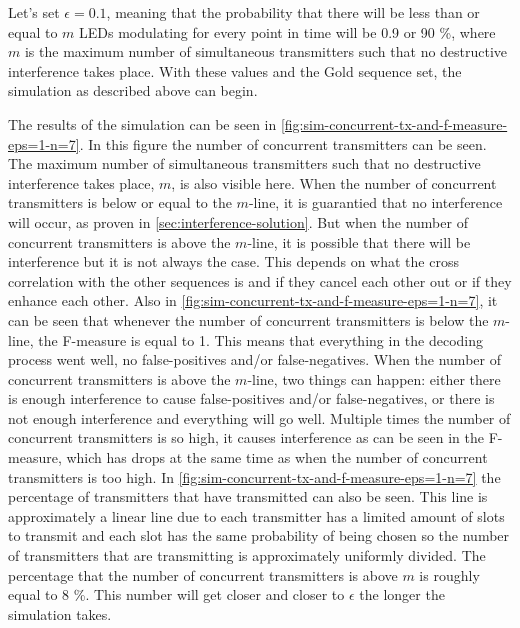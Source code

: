 Let's set $\epsilon = 0.1$, meaning that the probability that there will be less than or equal to $m$ LEDs modulating for every point in time will be 0.9 or 90 \%, where $m$ is the maximum number of simultaneous transmitters such that no destructive interference takes place.
With these values and the Gold sequence set, the simulation as described above can begin. 



The results of the simulation can be seen in \autoref{fig:sim-concurrent-tx-and-f-measure-eps=1-n=7}.
In this figure the number of concurrent transmitters can be seen. 
The maximum number of simultaneous transmitters such that no destructive interference takes place, $m$, is also visible here.
When the number of concurrent transmitters is below or equal to the $m$-line, it is guarantied that no interference will occur, as proven in \autoref{sec:interference-solution}.
But when the number of concurrent transmitters is above the $m$-line, it is possible that there will be interference but it is not always the case.
This depends on what the cross correlation with the other sequences is and if they cancel each other out or if they enhance each other.
Also in \autoref{fig:sim-concurrent-tx-and-f-measure-eps=1-n=7}, it can be seen that whenever the number of concurrent transmitters is below the $m$-line, the F-measure is equal to 1.
This means that everything in the decoding process went well, no false-positives and/or false-negatives.
When the number of concurrent transmitters is above the $m$-line, two things can happen: either there is enough interference to cause false-positives and/or false-negatives, or there is not enough interference and everything will go well.
Multiple times the number of concurrent transmitters is so high, it causes interference as can be seen in the F-measure, which has drops at the same time as when the number of concurrent transmitters is too high.
In \autoref{fig:sim-concurrent-tx-and-f-measure-eps=1-n=7} the percentage of transmitters that have transmitted can also be seen.
This line is approximately a linear line due to each transmitter has a limited amount of slots to transmit and each slot has the same probability of being chosen so the number of transmitters that are transmitting is approximately uniformly divided.
The percentage that the number of concurrent transmitters is above $m$ is roughly equal to 8 \%.
This number will get closer and closer to $\epsilon$ the longer the simulation takes.






